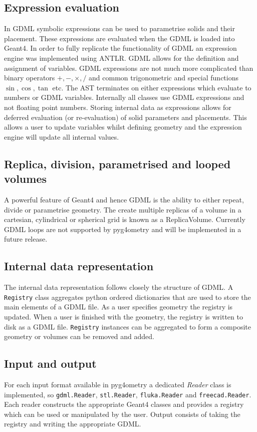 \documentclass[final,5p,times,twocolumn]{elsarticle}
\begin{document}
    
\subsection{Expression evaluation}
In GDML symbolic expressions can be used to parametrise solids and their placement. These expressions are evaluated when the GDML is loaded into Geant4. 
In order to fully replicate the functionality of GDML an expression engine was implemented using ANTLR. GDML allows for the definition and assignment of 
variables. GDML expressions are not much more complicated than binary operators $+, -, \times, /$ and common trigonometric and special functions $\sin, \cos, \tan$ etc. 
The AST terminates on either expressions which evaluate to numbers or GDML variables. Internally all classes use GDML expressions and not floating point numbers. 
Storing internal data as expressions allows for deferred evaluation (or re-evaluation) of solid parameters and placements. This allows a user to update variables whilst
defining geometry and the expression engine will update all internal values.  
 
\subsection{Replica, division, parametrised and looped volumes}
A powerful feature of Geant4 and hence GDML is the ability to either repeat, divide or parametrise geometry. The create multiple replicas of a volume in a cartesian, cylindrical or 
spherical grid is known as a ReplicaVolume. Currently GDML loops are not supported by pyg4ometry and will be implemented in a future release. 

\subsection{Internal data representation} 
The internal data representation follows closely the structure of GDML. A \verb|Registry| class aggregates python ordered dictionaries that are  used to store the main 
elements of a GDML file. As a user specifies geometry the registry is updated. When a user is finished with the geometry, the registry is written to disk as a GDML file.
\verb|Registry| instances can be aggregated to form a composite geometry or volumes can be removed and added.   
  
\subsection{Input and output} 
For each input format available in pyg4ometry a dedicated {\it Reader} class is implemented, so \verb|gdml.Reader|, \verb|stl.Reader|, \verb|fluka.Reader| 
and \verb|freecad.Reader|. Each reader constructs the appropriate Geant4 classes and provides a registry which can be used or manipulated by the user. 
Output consists of taking the registry and writing the appropriate GDML.
\end{document}

